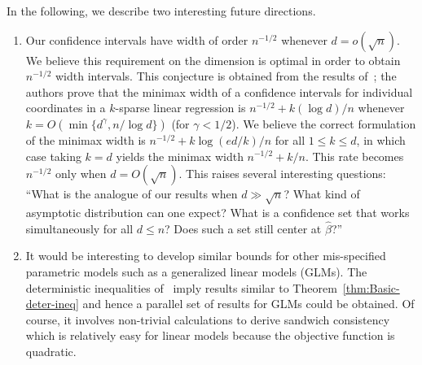 \documentclass{article}
\begin{document}
 In the following, we describe two interesting future directions.
 \begin{enumerate}
 \item Our confidence intervals have width of order $n^{-1/2}$ whenever $d = o(\sqrt{n})$. We believe this requirement on the dimension is optimal in order to obtain $n^{-1/2}$ width intervals. This conjecture is obtained from the results of~\cite{cai2017confidence}; the authors prove that the minimax width of a confidence intervals for individual coordinates in a $k$-sparse linear regression is $n^{-1/2} + k(\log d)/n$ whenever $k = O(\min\{d^{\gamma}, n/\log d\})$ (for $\gamma < 1/2$). We believe the correct formulation of the minimax width is $n^{-1/2} + k\log(ed/k)/n$ for all $1\le k\le d$, in which case taking $k = d$ yields the minimax width $n^{-1/2} + k/n$. This rate becomes $n^{-1/2}$ only when $d = O(\sqrt{n})$. This raises several interesting questions: ``What is the analogue of our results when $d \gg \sqrt{n}$? What kind of asymptotic distribution can one expect? What is a confidence set that works simultaneously for all $d \le n$? Does such a set still center at $\widehat{\beta}$?'' 
 \item It would be interesting to develop similar bounds for
 other mis-specified parametric models such as a generalized linear
 models (GLMs). The deterministic inequalities of~\cite{2018arXiv180905172K}
 imply results similar to Theorem~\ref{thm:Basic-deter-ineq} and hence
 a parallel set of results for GLMs could be obtained. Of course, it involves non-trivial calculations to derive sandwich consistency which is
 relatively easy for linear models because the objective function is quadratic.  
 \end{enumerate}
 
 \newpage
 
\end{document}
